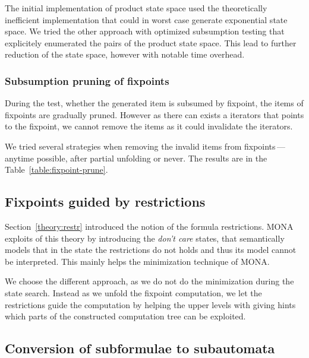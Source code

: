 	The initial implementation of product state space used the 
	theoretically inefficient implementation that could in worst
	case generate exponential state space. We tried the other
	approach with optimized subsumption testing that explicitely
	enumerated the pairs of the product state space. This lead to
	further reduction of the state space, however with notable 
	time overhead.
    
    \subsubsection{Subsumption pruning of fixpoints}
  
    During the test, whether the generated item is subsumed by
    fixpoint, the items of fixpoints are gradually pruned. However
    as there can exists a iterators that points to the fixpoint,
    we cannot remove the items as it could invalidate the iterators.
    
	We tried several strategies when removing the invalid items from
	fixpoints\,---\,anytime possible, after partial unfolding or 
	never. The results are in the Table~\ref{table:fixpoint-prune}.    
    
  
  \subsection{Fixpoints guided by restrictions}\label{opt:fixpoint-guides}
  
  Section~\ref{theory:restr} introduced the notion of the formula
  restrictions. MONA exploits of this theory by introducing the
  \emph{don't care} states, that semantically models that in the
  state the restrictions do not holds and thus its model cannot
  be interpreted. This mainly helps the minimization technique
  of MONA.
  
  We choose the different approach, as we do not do the minimization
  during the state search. Instead as we unfold the fixpoint 
  computation, we let the restrictions guide the computation by
  helping the upper levels with giving hints which parts of the
  constructed computation tree can be exploited.

  \subsection{Conversion of subformulae to subautomata}
  
